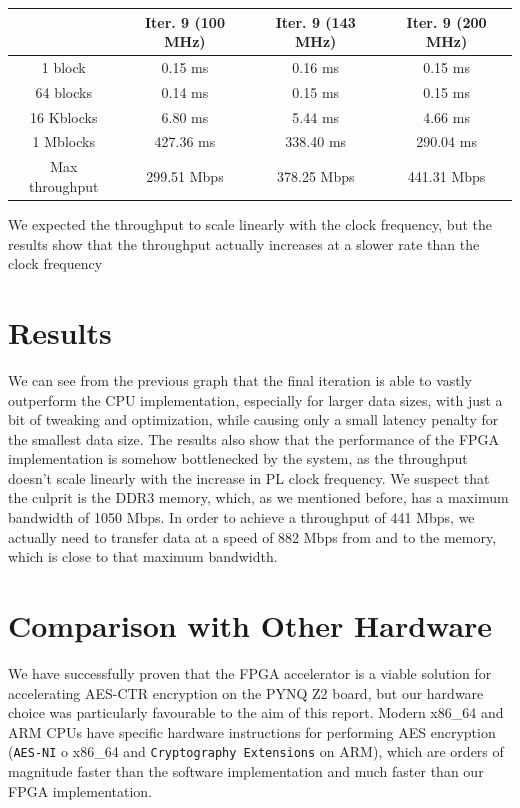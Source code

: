 \documentclass[12pt,oneside,a4paper]{article}
\begin{document}
\begin{table}[h!]
	\centering
	\begin{tabular}{cccc}
		\toprule
		 & Iter. 9 (100 MHz) & Iter. 9 (143 MHz) & Iter. 9 (200 MHz) \\
		\midrule
		1 block & 0.15 ms & 0.16 ms & 0.15 ms \\
		64 blocks & 0.14 ms & 0.15 ms & 0.15 ms \\
		16 Kblocks & 6.80 ms & 5.44 ms & 4.66 ms \\
		1 Mblocks & 427.36 ms & 338.40 ms & 290.04 ms \\
		Max throughput & 299.51 Mbps & 378.25 Mbps & 441.31 Mbps \\
		\bottomrule
	\end{tabular}
\end{table}

We expected the throughput to scale linearly with the clock frequency, but the results show that the throughput actually increases at a slower rate than the clock frequency

\section{Results} \label{sec:results}
We can see from the previous graph that the final iteration is able to vastly outperform the CPU implementation, especially for larger data sizes, with just a bit of tweaking and optimization, while causing only a small latency penalty for the smallest data size.
The results also show that the performance of the FPGA implementation is somehow bottlenecked by the system, as the throughput doesn't scale linearly with the increase in PL clock frequency.
We suspect that the culprit is the DDR3 memory, which, as we mentioned before, has a maximum bandwidth of 1050 Mbps. In order to achieve a throughput of 441 Mbps, we actually need to transfer data at a speed of 882 Mbps from and to the memory, which is close to that maximum bandwidth.

\section{Comparison with Other Hardware} \label{sec:conclusions}
We have successfully proven that the FPGA accelerator is a viable solution for accelerating AES-CTR encryption on the PYNQ Z2 board, but our hardware choice was particularly favourable to the aim of this report.
Modern x86\_64 and ARM CPUs have specific hardware instructions for performing AES encryption (\texttt{AES-NI} \cite{aes:aes-ni} o x86\_64 and \texttt{Cryptography Extensions} \cite{aes:arm-extensions} on ARM), which are orders of magnitude faster than the software implementation and much faster than our FPGA implementation.
\end{document}
